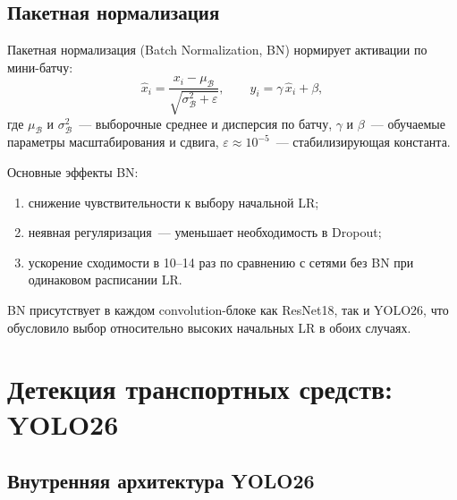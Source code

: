 \documentclass[10pt,a4paper]{report}
\numberwithin{equation}{chapter}
\numberwithin{figure}{chapter}
\numberwithin{table}{chapter}
\begin{document}
\subsection{Пакетная нормализация}

Пакетная нормализация (Batch Normalization, BN) нормирует активации
по мини-батчу:
\begin{equation}
  \hat{x}_i = \frac{x_i - \mu_\mathcal{B}}
               {\sqrt{\sigma_\mathcal{B}^2 + \varepsilon}},
  \qquad
  y_i = \gamma\,\hat{x}_i + \beta,
\end{equation}
где $\mu_\mathcal{B}$ и $\sigma_\mathcal{B}^2$~--- выборочные
среднее и дисперсия по батчу, $\gamma$ и $\beta$~--- обучаемые
параметры масштабирования и сдвига, $\varepsilon \approx 10^{-5}$~---
стабилизирующая константа.

Основные эффекты BN:
\begin{enumerate}[nosep]
  \item снижение чувствительности к выбору начальной LR;
  \item неявная регуляризация~--- уменьшает необходимость в Dropout;
  \item ускорение сходимости в 10--14 раз по сравнению с сетями
    без BN при одинаковом расписании LR.
\end{enumerate}
BN присутствует в каждом convolution-блоке как ResNet18, так
и YOLO26, что обусловило выбор относительно высоких начальных LR
в обоих случаях.

\section{Детекция транспортных средств: YOLO26}
\label{sec:yolo26}

\subsection{Внутренняя архитектура YOLO26}
\end{document}
